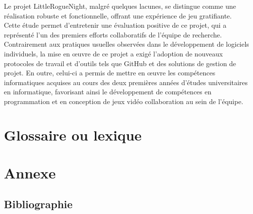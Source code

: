 \documentclass[10pt]{article}
\begin{document}
Le projet LittleRogueNight, malgré quelques lacunes, se distingue comme une réalisation robuste et fonctionnelle, offrant une expérience de jeu gratifiante. Cette étude permet d'entretenir une évaluation positive de ce projet, qui a représenté l'un des premiers efforts collaboratifs de l'équipe de recherche. Contrairement aux pratiques usuelles observées dans le développement de logiciels individuels, la mise en œuvre de ce projet a exigé l'adoption de nouveaux protocoles de travail et d'outils tels que GitHub et des solutions de gestion de projet. En outre, celui-ci a permis de mettre en œuvre les compétences informatiques acquises au cours des deux premières années d'études universitaires en informatique, favorisant ainsi le développement de compétences en programmation et en conception de jeux vidéo collaboration au sein de l'équipe.\\
\clearpage

\section{Glossaire ou lexique}

\section{Annexe}
   \subsection{Bibliographie}
   \printglossary
\end{document}
